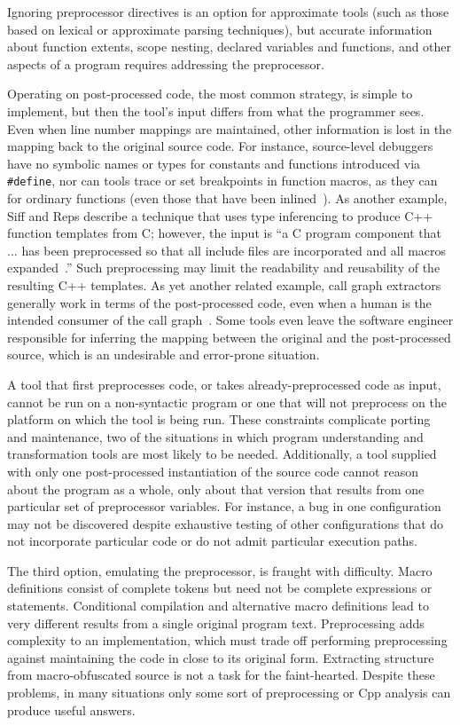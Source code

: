 \documentclass[11pt]{article}
\begin{document}
Ignoring preprocessor directives is an option for approximate tools (such
as those based on lexical or approximate parsing techniques), but accurate
information about function extents, scope nesting, declared variables and
functions, and other aspects of a program requires addressing the
preprocessor.

Operating on post-processed code, the most common strategy, is simple to
implement, but then the tool's input differs from what the
programmer sees.  Even when line number mappings are maintained, other
information is lost in the mapping back to the original source code.
For instance, source-level debuggers have no symbolic names or types
for constants and functions introduced via {\tt \#define}, nor can tools
trace or set breakpoints in function macros, as they can for ordinary
functions (even those that have been inlined~\cite{Zellweger83:TR}).
As another example, Siff
and Reps describe a technique that uses type inferencing to produce
C++ function templates from C; however, the input is ``a C program
component that $\ldots$ has been preprocessed so that all include
files are incorporated and all macros
expanded~\cite[p.~145]{Siff-fse96}.''  Such preprocessing may limit
the readability and reusability of the resulting C++ templates.  As
yet another related example, call graph extractors generally work in
terms of the post-processed code, even when a human is the intended
consumer of the call graph~\cite{Murphy-icse18}.  Some tools even
leave the software engineer responsible for inferring the mapping between the
original and the post-processed source, which is an undesirable and
error-prone situation.

A tool that first preprocesses code, or takes already-preprocessed code as
input, cannot be run on a non-syntactic program or one that will not
preprocess on the platform on which the tool is being run.  These
constraints complicate porting and maintenance, two of the situations in
which program understanding and transformation tools are most likely to be
needed.  Additionally, a tool supplied with only one post-processed
instantiation of the source code cannot reason about the program as a
whole, only about that version that results from one particular set of
preprocessor variables.  For instance, a bug in one configuration may not
be discovered despite exhaustive testing of other configurations that do
not incorporate particular code or do not admit particular execution paths.

The third option, emulating the preprocessor, is fraught with difficulty.
Macro definitions consist of complete tokens but need not be complete
expressions or statements.  Conditional compilation and alternative macro
definitions lead to very different results from a single original program
text.  Preprocessing adds complexity to an implementation, which must trade
off performing preprocessing against maintaining the code in close to its
original form.  Extracting structure from macro-obfuscated source is not a
task for the faint-hearted.  Despite these problems, in many situations
only some sort of preprocessing or Cpp analysis can produce useful answers.
\end{document}
